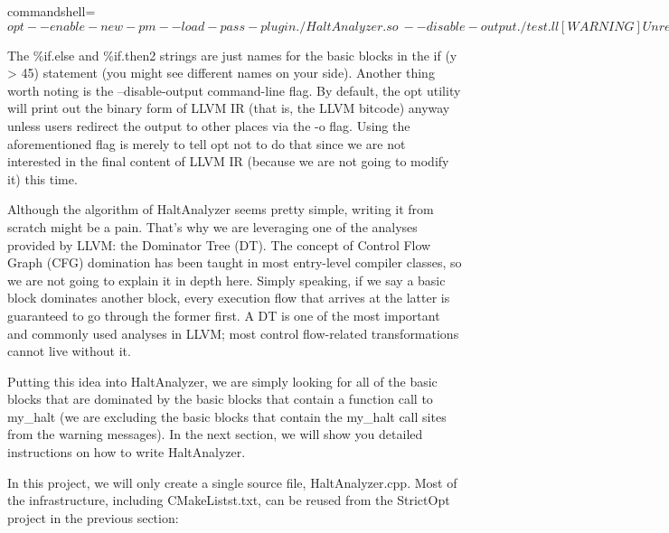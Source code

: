 \begin{tcblisting}{commandshell={}}
$ opt --enable-new-pm --load-pass-plugin ./HaltAnalyzer.so \
      --disable-output ./test.ll
[WARNING] Unreachable BB: label %
[WARNING] Unreachable BB: label %
$
\end{tcblisting}

The \%if.else and \%if.then2 strings are just names for the basic blocks in the if (y > 45) statement (you might see different names on your side). Another thing worth noting is the --disable-output command-line flag. By default, the opt utility will print out the binary form of LLVM IR (that is, the LLVM bitcode) anyway unless users redirect the output to other places via the -o flag. Using the aforementioned flag is merely to tell opt not to do that since we are not interested in the final content of LLVM IR (because we are not going to modify it) this time.

Although the algorithm of HaltAnalyzer seems pretty simple, writing it from scratch might be a pain. That's why we are leveraging one of the analyses provided by LLVM: the Dominator Tree (DT). The concept of Control Flow Graph (CFG) domination has been taught in most entry-level compiler classes, so we are not going to explain it in depth here. Simply speaking, if we say a basic block dominates another block, every execution flow that arrives at the latter is guaranteed to go through the former first. A DT is one of the most important and commonly used analyses in LLVM; most control flow-related transformations cannot live without it.

Putting this idea into HaltAnalyzer, we are simply looking for all of the basic blocks that are dominated by the basic blocks that contain a function call to my\_halt (we are excluding the basic blocks that contain the my\_halt call sites from the warning messages). In the next section, we will show you detailed instructions on how to write HaltAnalyzer.



In this project, we will only create a single source file, HaltAnalyzer.cpp. Most of the infrastructure, including CMakeListst.txt, can be reused from the StrictOpt project in the previous section:


